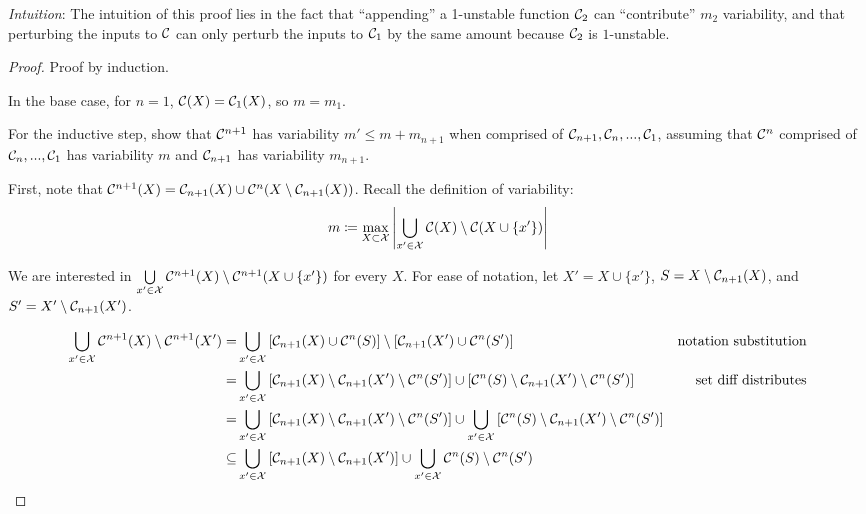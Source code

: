 \textit{Intuition}:
The intuition of this proof lies in the fact that ``appending'' a 1-unstable function $\mathcal{C}_2$ can ``contribute'' $m_2$ variability, and that perturbing the inputs to $\mathcal{C}$ can only perturb the inputs to $\mathcal{C}_1$ by the same amount because $\mathcal{C}_2$ is $1$-unstable.
\begin{proof}
Proof by induction.

In the base case, for $n = 1$, $\mathcal{C}(X) = \mathcal{C}_1(X)$, so $m = m_1$.

For the inductive step, show that $\mathcal{C}^{n+1}$ has variability $m' \leq m + m_{n+1}$ when comprised of $\mathcal{C}_{n+1}, \mathcal{C}_n, ..., \mathcal{C}_1$, assuming that $\mathcal{C}^n$ comprised of $\mathcal{C}_n,...,\mathcal{C}_1$ has variability $m$ and $\mathcal{C}_{n+1}$ has variability $m_{n+1}$.

First, note that $\mathcal{C}^{n+1}(X) = \mathcal{C}_{n+1}(X) \cup \mathcal{C}^n(X \setminus \mathcal{C}_{n+1}(X))$.
Recall the definition of variability:
\[
m \coloneqq \max_{X\subset \mathcal{X}} \left|\bigcup\limits_{x'\in\mathcal{X}} \mathcal{C}(X) \setminus \mathcal{C}(X \cup \{x'\})\right|
\]

We are interested in $\bigcup\limits_{x'\in\mathcal{X}} \mathcal{C}^{n+1}(X) \setminus \mathcal{C}^{n+1}(X \cup \{x'\})$ for every $X$.
For ease of notation, let $X' = X \cup \{x'\}$, $S = X \setminus \mathcal{C}_{n+1}(X)$, and $S' = X' \setminus \mathcal{C}_{n+1}(X')$.

\begin{align*}
    \bigcup\limits_{x'\in\mathcal{X}} \mathcal{C}^{n+1}(X) \setminus \mathcal{C}^{n+1}(X')
    = & \bigcup\limits_{x'\in\mathcal{X}} \left[\mathcal{C}_{n+1}(X) \cup \mathcal{C}^n(S)\right] \setminus \left[\mathcal{C}_{n+1}(X') \cup \mathcal{C}^n(S')\right] & \text{notation substitution}\\
    = & \bigcup\limits_{x'\in\mathcal{X}} \left[\mathcal{C}_{n+1}(X)  \setminus \mathcal{C}_{n+1}(X')  \setminus \mathcal{C}^n(S')\right] \cup \left[\mathcal{C}^n(S) \setminus \mathcal{C}_{n+1}(X')  \setminus \mathcal{C}^n(S')\right]
    & \text{set diff distributes} \\
    = & \bigcup\limits_{x'\in\mathcal{X}}  \left[\mathcal{C}_{n+1}(X)  \setminus \mathcal{C}_{n+1}(X')  \setminus \mathcal{C}^n(S')\right] \cup \bigcup\limits_{x'\in\mathcal{X}} \left[\mathcal{C}^n(S) \setminus \mathcal{C}_{n+1}(X')  \setminus \mathcal{C}^n(S')\right] \\
    \subseteq & \bigcup\limits_{x'\in\mathcal{X}}  \left[\mathcal{C}_{n+1}(X)  \setminus \mathcal{C}_{n+1}(X') \right] \cup \bigcup\limits_{x'\in\mathcal{X}} \mathcal{C}^n(S)\setminus \mathcal{C}^n(S') \\
\end{align*}


\end{proof}
